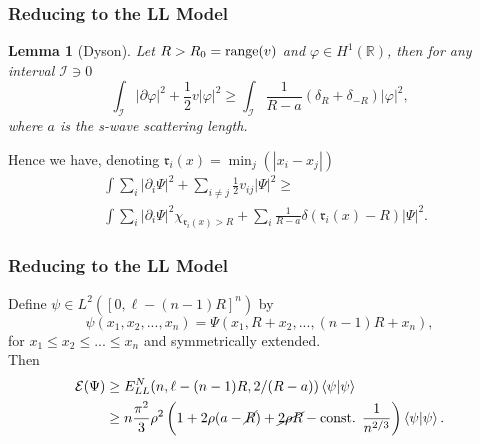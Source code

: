 \documentclass{beamer}[10]
\newcommand{\abs}[1]{\left\lvert #1 \right\rvert}
\renewcommand{\braket}[1]{\left\langle#1\right\rangle}
\newcommand{\R}{\mathbb{R}}
\newtheorem{mlemma}{Lemma}
\begin{document}
\begin{frame}
	\frametitle{Reducing to the LL Model}
	\begin{block}{}
		\vspace{-0.5cm}
	\begin{mlemma}[Dyson]\label{LemmaDyson} Let $ R>R_0=\textnormal{range}(v) $ and $ \varphi\in H^1(\R) $, then for any interval $ \mathcal{I}\ni 0 $ 
		\begin{equation}
		\int_{\mathcal{I}} \abs{\partial \varphi}^2+\frac12 v\abs{\varphi}^2\geq \int_{\mathcal{I}}\frac{1}{R-a}\left(\delta_R+\delta_{-R}\right)\abs{\varphi}^2,
		\end{equation}
		where $ a $ is the s-wave scattering length.
	\end{mlemma}
	Hence we have, denoting $ \mathfrak{r}_{i}(x)=\min_j(\abs{x_i-x_j}) $ \begin{equation}
	\begin{aligned}
	&\int \sum_{i}\abs{\partial_i\Psi}^2+\sum_{i\neq j} \frac{1}{2}v_{ij}\abs{\Psi}^2\geq\\ &\int\sum_{i}\abs{\partial_i\Psi}^2\chi_{\mathfrak{r}_i(x)>R}+\sum_{i}\frac{1}{R-a}\delta(\mathfrak{r}_i(x)-R)\abs{\Psi}^2.
	\end{aligned}
	\end{equation}	
	\end{block}	
\end{frame}


\begin{frame}
	\frametitle{Reducing to the LL Model}
	\begin{block}{}
		Define $ \psi\in L^2([0,\ell-(n-1)R]^n) $ by 
			$$ \psi(x_1,x_2,...,x_n)=\Psi(x_1,R+x_2,...,(n-1)R+x_n), $$
			 for $ x_1\leq x_2\leq...\leq x_n $ and symmetrically extended.\\\vspace{0.2cm}
			 Then \begin{equation}
			 \begin{aligned}
			 \mathcal{E}(\Psi)&\geq E^N_{LL}(n,\ell-(n-1)R,2/(R-a))\braket{\psi|\psi}\\
			 &\geq n\frac{\pi^2}{3}\rho^2\left(1+2\rho(a-\cancel{R})+\cancel{2\rho R}-\text{const. }\frac{1}{n^{2/3}}\right)\braket{\psi|\psi}.
			 \end{aligned}
			 \end{equation}
	\end{block}	
\end{frame}
\end{document}
